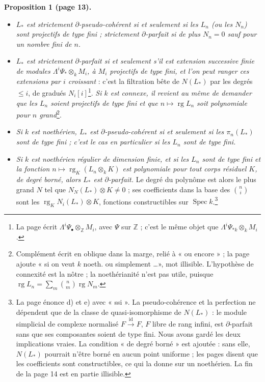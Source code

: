 \documentclass[11pt,a4paper]{article}
\begin{document}
\textbf{Proposition 1 (page 13).}
\begin{itemize}
\item[a), b)] \emph{$L_{*}$ est strictement $\partial$-pseudo-cohérent si et
seulement si les $L_{n}$ (ou les $N_{n}$) sont projectifs de type fini ;
strictement $\partial$-parfait si de plus $N_{n} = 0$ sauf pour un nombre
fini de $n$.}
\item[c)] \emph{$L_{*}$ est strictement $\partial$-parfait si et seulement
s'il est extension successive finie de modules
$\Lambda^{i}\Psi_{*} \otimes_{k} M_{i}$, à $M_{i}$ projectifs de type fini,
et l'on peut ranger ces extensions par $i$ croissant} : c'est la filtration
bête de $N(L_{*})$ par les degrés $\leqslant i$, de gradués
$N_{i}[i]$\footnote{La page écrit $\Lambda^{i}\Psi_{\bullet}
\otimes_{\mathbb{Z}} M_{i}$, avec $\Psi$ sur $\mathbb{Z}$ ; c'est le même
objet que $\Lambda^{i}\Psi_{*k} \otimes_{k} M_{i}$.}. \emph{Si $k$ est
connexe, il revient au même de demander que les $L_{n}$ soient projectifs de
type fini et que $n \mapsto \operatorname{rg} L_{n}$ soit polynomiale pour
$n$ grand}\footnote{Complément écrit en oblique dans la marge, relié à « ou
encore » ; la page ajoute « si on veut $k$ noeth. ou simplement \ldots », mot
illisible. L'hypothèse de connexité est la nôtre ; la noethérianité n'est
pas utile, puisque $\operatorname{rg} L_{n} = \sum_{m} \binom{n}{m}
\operatorname{rg} N_{m}$.}.
\item[d)] \emph{Si $k$ est noethérien, $L_{*}$ est $\partial$-pseudo-cohérent
si et seulement si les $\pi_{n}(L_{*})$ sont de type fini ; c'est le cas en
particulier si les $L_{n}$ sont de type fini.}
\item[e)] \emph{Si $k$ est noethérien régulier de dimension finie, et si les
$L_{n}$ sont de type fini et la fonction $n \mapsto \operatorname{rg}_{K}
(L_{n} \otimes_{k} K)$ est polynomiale pour tout corps résiduel $K$, de degré
borné, alors $L_{*}$ est $\partial$-parfait.} Le degré du polynôme est alors
le plus grand $N$ tel que $N_{N}(L_{*}) \otimes K \neq 0$ ; ses coefficients
dans la base des $\binom{n}{i}$ sont les $\operatorname{rg}_{K}
N_{i}(L_{*}) \otimes K$, fonctions constructibles sur $\operatorname{Spec}
k$.\footnote{La page énonce d) et e) avec « ssi ». La pseudo-cohérence et la
perfection ne dépendent que de la classe de quasi-isomorphisme de
$N(L_{*})$ : le module simplicial de complexe normalisé $F
\xrightarrow{\mathrm{id}} F$, $F$ libre de rang infini, est
$\partial$-parfait sans que ses composantes soient de type fini. Nous avons
gardé les deux implications vraies. La condition « de degré borné » est
ajoutée : sans elle, $N(L_{*})$ pourrait n'être borné en aucun point
uniforme ; les pages disent que les coefficients sont constructibles, ce qui
la donne sur un noethérien. La fin de la page 14 est en partie illisible.}
\end{itemize}
\end{document}
